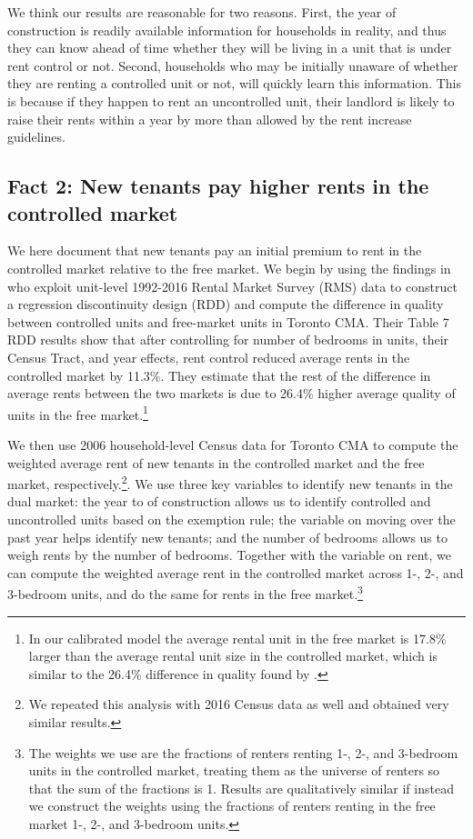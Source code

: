 \documentclass[parskip=full]{article}
\begin{document}
We think our results are reasonable for two reasons. First, the year of construction is readily available information for households in reality, and thus they can know ahead of time whether they will be living in a unit that is under rent control or not. Second, households who may be initially unaware of whether they are renting a controlled unit or not, will quickly learn this information. This is because if they happen to rent an uncontrolled unit, their landlord is likely to raise their rents within a year by more than allowed by the rent increase guidelines.

\subsection{Fact 2: New tenants pay higher rents in the controlled market}\label{sec:rent_premium} 

We here document that new tenants pay an initial premium to rent in the controlled market relative to the free market. We begin by using the findings in \citet{zhang-gou} who exploit unit-level 1992-2016 Rental Market Survey (RMS) data to construct a regression discontinuity design (RDD) and compute the difference in quality between controlled units and free-market units in Toronto CMA. Their Table 7 RDD results show that after controlling for number of bedrooms in units, their Census Tract, and year effects, rent control reduced average rents in the controlled market by 11.3\%. They estimate that the rest of the difference in average rents between the two markets is due to 26.4\% higher average quality of units in the free market.\footnote{In our calibrated model the average rental unit in the free market is 17.8\% larger than the average rental unit size in the controlled market, which is similar to the 26.4\% difference in quality found by \citet{zhang-gou}.} 

We then use 2006 household-level Census data for Toronto CMA to compute the weighted average rent of new tenants in the controlled market and the free market, respectively.\footnote{We repeated this analysis with 2016 Census data as well and obtained very similar results.}. We use three key variables to identify new tenants in the dual market: the year to of construction allows us to identify controlled and uncontrolled units based on the exemption rule; the variable on moving over the past year helps identify new tenants; and the number of bedrooms allows us to weigh rents by the number of bedrooms. Together with the variable on rent, we can compute the weighted average rent in the controlled market across 1-, 2-, and 3-bedroom units, and do the same for rents in the free market.\footnote{The weights we use are the fractions of renters renting 1-, 2-, and 3-bedroom units in the controlled market, treating them as the universe of renters so that the sum of the fractions is 1. Results are qualitatively similar if instead we construct the weights using the fractions of renters renting in the free market 1-, 2-, and 3-bedroom units.} 
\end{document}
